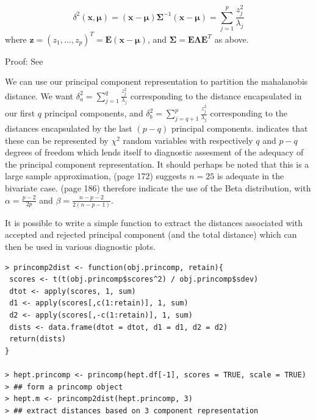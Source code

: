 \begin{theorem}
\begin{equation}
\label{Qstats}
\delta^{2}(\boldsymbol{x}, \boldsymbol{\mu}) = (\boldsymbol{x} -  \boldsymbol{\mu}) \boldsymbol{\Sigma}^{-1} (\boldsymbol{x} -  \boldsymbol{\mu}) = \sum_{j=1}^{p} \frac{z_{j}^{2}}{\lambda_{j}}
\end{equation}
where $\boldsymbol{z} = (z_{1}, \ldots, z_{p})^{T} = \boldsymbol{E}(\boldsymbol{x}- \boldsymbol{\mu})$, and $\boldsymbol{\Sigma} = \boldsymbol{E \Lambda E}^{T}$ as above.   
\end{theorem}
Proof: See \cite{Flury:1997}

We can use our principal component representation to partition the mahalanobis distance.   We want $\delta_{a}^{2} =  \sum_{j=1}^{q} \frac{z_{j}^{2}}{\lambda_{j}}$ corresponding to the distance encapsulated in our first $q$ principal components, and $\delta_{b}^{2} =  \sum_{j=q+1}^{p} \frac{z_{j}^{2}}{\lambda_{j}}$ corresponding to the distances encapsulated by the last $(p-q)$ principal components.   \cite{Flury:1997} indicates that these can be represented by $\chi^{2}$ random variables with respectively $q$ and $p-q$ degrees of freedom which lends itself to diagnostic assesment of the adequacy of the principal component representation.   It should perhaps be noted that this is a large sample approximation, \cite{Gnanadesikan:1977} (page 172) suggests $n = 25$ is adequate in the bivariate case.   \cite{Bilodeau+Brenner:1999} (page 186) therefore indicate the use of the Beta distribution, with $\alpha = \frac{p-2}{2p}$ and $\beta = \frac{n - p - 2}{2(n - p - 1)}$.   


It is possible to write a simple function to extract the distances associated with accepted and rejected principal component (and the total distance) which can then be used in various diagnostic plots.

\singlespacing
\begin{verbatim}
> princomp2dist <- function(obj.princomp, retain){
 scores <- t(t(obj.princomp$scores^2) / obj.princomp$sdev)
 dtot <- apply(scores, 1, sum)
 d1 <- apply(scores[,c(1:retain)], 1, sum)
 d2 <- apply(scores[,-c(1:retain)], 1, sum)
 dists <- data.frame(dtot = dtot, d1 = d1, d2 = d2)
 return(dists)
}

> hept.princomp <- princomp(hept.df[-1], scores = TRUE, scale = TRUE)
> ## form a princomp object
> hept.m <- princomp2dist(hept.princomp, 3)
> ## extract distances based on 3 component representation
\end{verbatim}
\onehalfspacing

